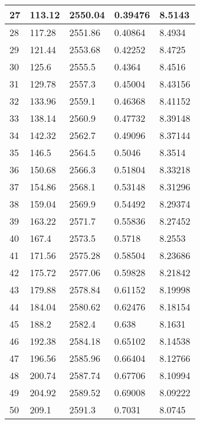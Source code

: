 \documentclass[twocolumn]{article}
\begin{document}
\begin{tabular}{l|l|l|l|l}
27	&	113.12	&	2550.04	&	0.39476	&	8.5143 \\ \hline
28	&	117.28	&	2551.86	&	0.40864	&	8.4934 \\ \hline
29	&	121.44	&	2553.68	&	0.42252	&	8.4725 \\ \hline
30	&	125.6	&	2555.5	&	0.4364	&	8.4516 \\ \hline
31	&	129.78	&	2557.3	&	0.45004	&	8.43156 \\ \hline
32	&	133.96	&	2559.1	&	0.46368	&	8.41152 \\ \hline
33	&	138.14	&	2560.9	&	0.47732	&	8.39148 \\ \hline
34	&	142.32	&	2562.7	&	0.49096	&	8.37144 \\ \hline
35	&	146.5	&	2564.5	&	0.5046	&	8.3514 \\ \hline
36	&	150.68	&	2566.3	&	0.51804	&	8.33218 \\ \hline
37	&	154.86	&	2568.1	&	0.53148	&	8.31296 \\ \hline
38	&	159.04	&	2569.9	&	0.54492	&	8.29374 \\ \hline
39	&	163.22	&	2571.7	&	0.55836	&	8.27452 \\ \hline
40	&	167.4	&	2573.5	&	0.5718	&	8.2553 \\ \hline
41	&	171.56	&	2575.28	&	0.58504	&	8.23686 \\ \hline
42	&	175.72	&	2577.06	&	0.59828	&	8.21842 \\ \hline
43	&	179.88	&	2578.84	&	0.61152	&	8.19998 \\ \hline
44	&	184.04	&	2580.62	&	0.62476	&	8.18154 \\ \hline
45	&	188.2	&	2582.4	&	0.638	&	8.1631 \\ \hline
46	&	192.38	&	2584.18	&	0.65102	&	8.14538 \\ \hline
47	&	196.56	&	2585.96	&	0.66404	&	8.12766 \\ \hline
48	&	200.74	&	2587.74	&	0.67706	&	8.10994 \\ \hline
49	&	204.92	&	2589.52	&	0.69008	&	8.09222 \\ \hline
50	&	209.1	&	2591.3	&	0.7031	&	8.0745 \\ \hline
\end{tabular}
\end{document}
